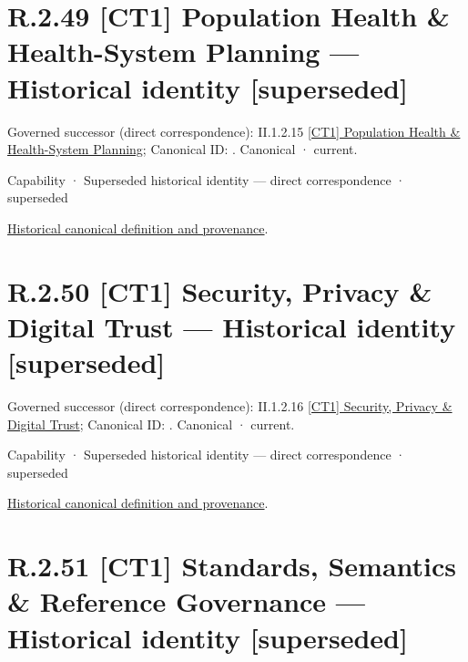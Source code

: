 \section*{R.2.49 [CT1] Population Health \& Health-System Planning — Historical identity [superseded]}
\label{navigation:R.2.49}

{\small Governed successor (direct correspondence): II.1.2.15 \hyperref[element:c63b38b37e9b4e9b97dc87ed54604def]{[CT1] Population Health \& Health-System Planning}; Canonical ID: \texttt{}. Canonical · current.}\par
\label{element:a5003436a7f348b1bff60ba593adfa27}
{\small Capability · Superseded historical identity — direct correspondence · superseded}\par
\href{../../../../continuum/strategy/capability/a5003436a7f348b1bff60ba593adfa27.md}{Historical canonical definition and provenance}.\par
\section*{R.2.50 [CT1] Security, Privacy \& Digital Trust — Historical identity [superseded]}
\label{navigation:R.2.50}

{\small Governed successor (direct correspondence): II.1.2.16 \hyperref[element:71f0431fdfcd4f779e16d9e5ea609833]{[CT1] Security, Privacy \& Digital Trust}; Canonical ID: \texttt{}. Canonical · current.}\par
\label{element:b01441b2f5584fc2b9c3988643a7c93b}
{\small Capability · Superseded historical identity — direct correspondence · superseded}\par
\href{../../../../continuum/strategy/capability/b01441b2f5584fc2b9c3988643a7c93b.md}{Historical canonical definition and provenance}.\par
\section*{R.2.51 [CT1] Standards, Semantics \& Reference Governance — Historical identity [superseded]}
\label{navigation:R.2.51}

